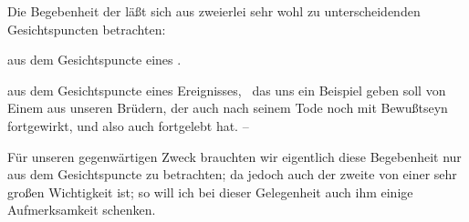 Die Begebenheit der  läßt sich aus zweierlei sehr wohl zu unterscheidenden Gesichtspuncten betrachten:
\begin{aufzb}
\item aus dem Gesichtspuncte eines .
\item aus dem Gesichtspuncte eines Ereignisses,  \dh\ das uns ein Beispiel geben soll von Einem aus unseren Brüdern, der auch nach seinem Tode noch mit Bewußtseyn fortgewirkt, und also auch fortgelebt hat. --
\end{aufzb}
Für unseren gegenwärtigen Zweck brauchten wir eigentlich diese Begebenheit nur aus dem  Gesichtspuncte zu betrachten; da jedoch auch der zweite von einer sehr großen Wichtigkeit ist; so will ich bei dieser Gelegenheit auch ihm einige Aufmerksamkeit schenken.\par

